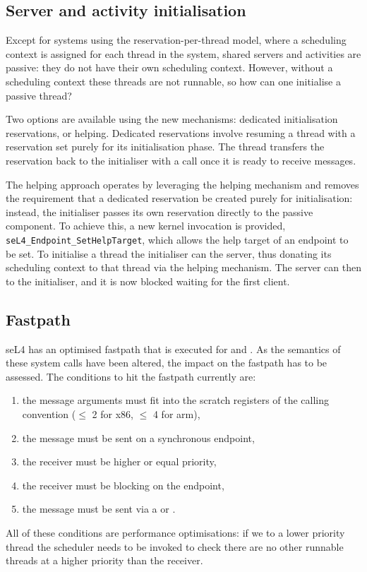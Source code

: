 \subsection{Server and activity initialisation}

Except for systems using the reservation-per-thread model, where a scheduling context is assigned for each thread in the system, shared servers and activities are passive: they do not have their own scheduling context.
However, without a scheduling context these threads are not runnable, so how can one initialise a passive thread?

Two options are available using the new mechanisms: dedicated initialisation reservations, or helping.
Dedicated reservations involve resuming a thread with a reservation set purely for its initialisation phase.
The thread transfers the reservation back to the initialiser with a \sendwait call once it is ready to receive messages.

The helping approach operates by leveraging the helping mechanism and removes the requirement that a dedicated reservation be created purely for initialisation: instead, the initialiser passes its own reservation directly to the passive component.
To achieve this, a new kernel invocation is provided, \texttt{seL4\_Endpoint\_SetHelpTarget}, which allows the help target of an endpoint to be set.
To initialise a thread the initialiser can \call the server, thus donating its scheduling context to that thread via the helping mechanism.
The server can then \replywait to the initialiser, and it is now blocked waiting for the first client.

\subsection{Fastpath}

seL4 has an optimised fastpath that is executed for \call and \replywait.
As the semantics of these system calls have been altered, the impact on the fastpath has to be assessed.
The conditions to hit the fastpath currently are:
\begin{enumerate}
    \item the message arguments must fit into the scratch registers of the calling convention ($\leq$ 2 for x86, $\leq$ 4 for arm),
    \item the message must be sent on a synchronous endpoint,
    \item the receiver must be higher or equal priority,
    \item the receiver must be blocking on the endpoint,
    \item the message must be sent via a \call or \replywait.
\end{enumerate}
All of these conditions are performance optimisations: if we \call to a lower priority thread the
scheduler needs to be invoked to check there are no other runnable threads at a higher priority than the receiver.

